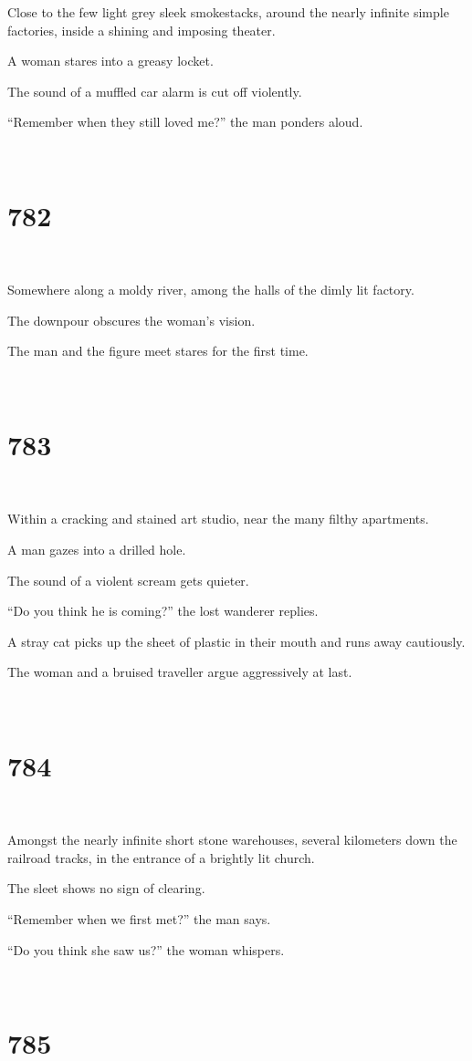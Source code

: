 \documentclass{report}
\begin{document}
Close to the few light grey sleek smokestacks, around the nearly infinite simple factories, inside a shining and imposing theater.

A woman stares into a greasy locket.

The sound of a muffled car alarm is cut off violently.

``Remember when they still loved me?'' the man ponders aloud.

~
\chapter*{782}
~

Somewhere along a moldy river, among the halls of the dimly lit factory.

The downpour obscures the woman's vision.

The man and the figure meet stares for the first time.

~
\chapter*{783}
~

Within a cracking and stained art studio, near the many filthy apartments.

A man gazes into a drilled hole.

The sound of a violent scream gets quieter.

``Do you think he is coming?'' the lost wanderer replies.

A stray cat picks up the sheet of plastic in their mouth and runs away cautiously.

The woman and a bruised traveller argue aggressively at last.

~
\chapter*{784}
~

Amongst the nearly infinite short stone warehouses, several kilometers down the railroad tracks, in the entrance of a brightly lit church.

The sleet shows no sign of clearing.

``Remember when we first met?'' the man says.

``Do you think she saw us?'' the woman whispers.

~
\chapter*{785}
~
\end{document}
